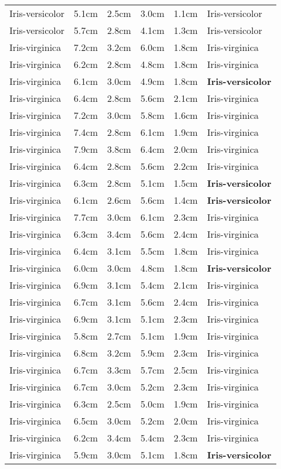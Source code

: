 \documentclass[a4paper, 12pt]{article}
\begin{document}
\begin{center}
\begin{longtable}{ l l l l l l }
Iris-versicolor & 5.1cm & 2.5cm & 3.0cm & 1.1cm & Iris-versicolor\\
Iris-versicolor & 5.7cm & 2.8cm & 4.1cm & 1.3cm & Iris-versicolor\\
Iris-virginica & 7.2cm & 3.2cm & 6.0cm & 1.8cm & Iris-virginica\\
Iris-virginica & 6.2cm & 2.8cm & 4.8cm & 1.8cm & Iris-virginica\\
Iris-virginica & 6.1cm & 3.0cm & 4.9cm & 1.8cm & \textbf{Iris-versicolor}\\
Iris-virginica & 6.4cm & 2.8cm & 5.6cm & 2.1cm & Iris-virginica\\
Iris-virginica & 7.2cm & 3.0cm & 5.8cm & 1.6cm & Iris-virginica\\
Iris-virginica & 7.4cm & 2.8cm & 6.1cm & 1.9cm & Iris-virginica\\
Iris-virginica & 7.9cm & 3.8cm & 6.4cm & 2.0cm & Iris-virginica\\
Iris-virginica & 6.4cm & 2.8cm & 5.6cm & 2.2cm & Iris-virginica\\
Iris-virginica & 6.3cm & 2.8cm & 5.1cm & 1.5cm & \textbf{Iris-versicolor}\\
Iris-virginica & 6.1cm & 2.6cm & 5.6cm & 1.4cm & \textbf{Iris-versicolor}\\
Iris-virginica & 7.7cm & 3.0cm & 6.1cm & 2.3cm & Iris-virginica\\
Iris-virginica & 6.3cm & 3.4cm & 5.6cm & 2.4cm & Iris-virginica\\
Iris-virginica & 6.4cm & 3.1cm & 5.5cm & 1.8cm & Iris-virginica\\
Iris-virginica & 6.0cm & 3.0cm & 4.8cm & 1.8cm & \textbf{Iris-versicolor}\\
Iris-virginica & 6.9cm & 3.1cm & 5.4cm & 2.1cm & Iris-virginica\\
Iris-virginica & 6.7cm & 3.1cm & 5.6cm & 2.4cm & Iris-virginica\\
Iris-virginica & 6.9cm & 3.1cm & 5.1cm & 2.3cm & Iris-virginica\\
Iris-virginica & 5.8cm & 2.7cm & 5.1cm & 1.9cm & Iris-virginica\\
Iris-virginica & 6.8cm & 3.2cm & 5.9cm & 2.3cm & Iris-virginica\\
Iris-virginica & 6.7cm & 3.3cm & 5.7cm & 2.5cm & Iris-virginica\\
Iris-virginica & 6.7cm & 3.0cm & 5.2cm & 2.3cm & Iris-virginica\\
Iris-virginica & 6.3cm & 2.5cm & 5.0cm & 1.9cm & Iris-virginica\\
Iris-virginica & 6.5cm & 3.0cm & 5.2cm & 2.0cm & Iris-virginica\\
Iris-virginica & 6.2cm & 3.4cm & 5.4cm & 2.3cm & Iris-virginica\\
Iris-virginica & 5.9cm & 3.0cm & 5.1cm & 1.8cm & \textbf{Iris-versicolor}\\
			
		\end{longtable}
		\end{center}	
\end{document}
